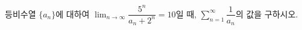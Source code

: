 등비수열 $\{a_n\}$에 대하여 $\displaystyle\lim_{n\to\infty}\dfrac{5^n}{a_n+2^n}=10$일 때, $\displaystyle\sum_{n=1}^{\infty}\dfrac{1}{a_n}$의 값을 구하시오.
